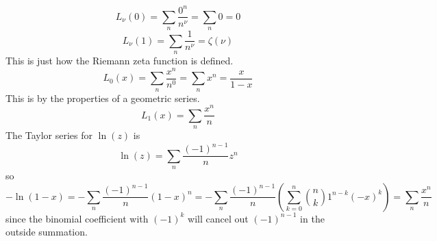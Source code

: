 \documentclass[a4paper,twoside]{article}
\begin{document}
\begin{itemize}
        \begin{problem}
            \begin{equation}
                L_{\nu}(0) = \sum_n \frac{0^n}{n^{\nu}} = \sum_n 0 = 0
            \end{equation}
            \begin{equation}
                L_{\nu}(1) = \sum_n \frac{1}{n^{\nu}} = \zeta(\nu)
            \end{equation}
            This is just how the Riemann zeta function is defined.
            \begin{equation}
                L_0(x) = \sum_n \frac{x^n}{n^0} = \sum_n x^n = \frac{x}{1 - x}
            \end{equation}
            This is by the properties of a geometric series.
            \begin{equation}
                L_1(x) = \sum_n \frac{x^n}{n}
            \end{equation}
            The Taylor series for $ \ln(z) $ is
            \begin{equation}
                \ln(z) = \sum_n \frac{(-1)^{n-1}}{n} z^n
            \end{equation}
            so
            \begin{equation}
                -\ln(1-x) = - \sum_n \frac{(-1)^{n-1}}{n} (1-x)^n = - \sum_n \frac{(-1)^{n-1}}{n} \left( \sum_{k=0}^{n} \binom{n}{k} 1^{n-k} (-x)^k \right) = \sum_n \frac{x^n}{n}
            \end{equation}
            since the binomial coefficient with $ (-1)^k $ will cancel out $ (-1)^{n-1} $ in the outside summation.
        \end{problem}
\end{itemize}
\end{document}
